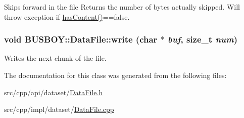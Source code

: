 Skips forward in the file Returns the number of bytes actually skipped. Will throw exception if \hyperlink{classBUSBOY_1_1DataFile_aa127c5ce6db57b3e35151a2c44404f0a}{hasContent()}==false. \hypertarget{classBUSBOY_1_1DataFile_a1dc9c082abb0c99f0f0354c71c6754c3}{
\subsubsection[{write}]{\setlength{\rightskip}{0pt plus 5cm}void BUSBOY::DataFile::write (char $\ast$ {\em buf}, \/  size\_\-t {\em num})}}
\label{classBUSBOY_1_1DataFile_a1dc9c082abb0c99f0f0354c71c6754c3}


Writes the next chunk of the file. 

The documentation for this class was generated from the following files:\begin{DoxyCompactItemize}
\item 
src/cpp/api/dataset/\hyperlink{DataFile_8h}{DataFile.h}\item 
src/cpp/impl/dataset/\hyperlink{DataFile_8cpp}{DataFile.cpp}\end{DoxyCompactItemize}
